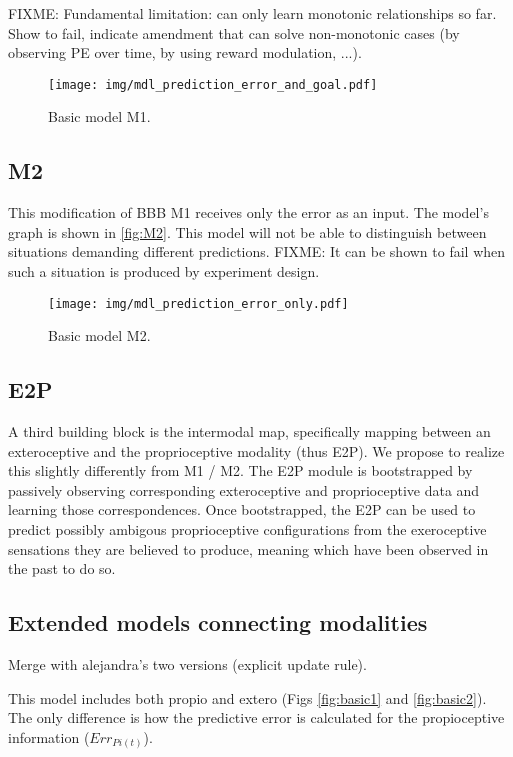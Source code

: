 \documentclass[11pt]{llncs}
\begin{document}
FIXME: Fundamental limitation: can only learn monotonic relationships so
far. Show to fail, indicate amendment that can solve non-monotonic
cases (by observing PE over time, by using reward modulation, ...).

\begin{figure}
  \centering
  \texttt{[image: img/mdl\_prediction\_error\_and\_goal.pdf]}
  \caption{\label{fig:M1} Basic model M1.}
\end{figure}

\subsection{M2}

This modification of BBB M1 receives only the error as an input. The
model's graph is shown in \autoref{fig:M2}. This model will not be
able to distinguish between situations demanding different
predictions. FIXME: It can be shown to fail when such a situation is produced
by experiment design.

\begin{figure}
  \centering
  \texttt{[image: img/mdl\_prediction\_error\_only.pdf]}
  \caption{\label{fig:M2} Basic model M2.}
\end{figure}

\subsection{E2P}

A third building block is the intermodal map, specifically mapping
between an exteroceptive and the proprioceptive modality (thus
E2P). We propose to realize this slightly differently from M1 /
M2. The E2P module is bootstrapped by passively observing
corresponding exteroceptive and proprioceptive data and learning those
correspondences. Once bootstrapped, the E2P can be used to predict
possibly ambigous proprioceptive configurations from the exeroceptive
sensations they are believed to produce, meaning which have been
observed in the past to do so.

\subsection{Extended models connecting modalities}

Merge with alejandra's two versions (explicit update rule).

This model includes both propio and extero (Figs \ref{fig:basic1}
and \ref{fig:basic2}). The only difference is how the 
predictive error is calculated for the propioceptive information ($Err_{Pi(t)}$).
\end{document}
